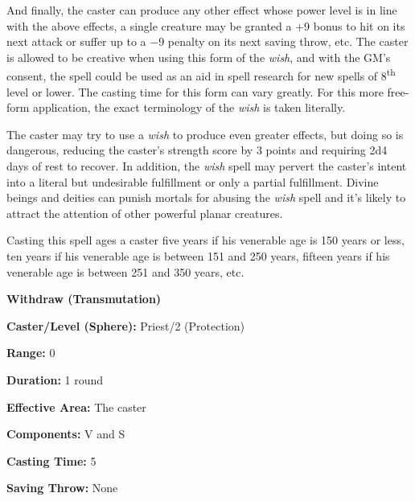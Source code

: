 \begin{multicols}{2}
And finally, the caster can produce any other effect whose power level is in line with the above effects, a single creature may be granted a +9 bonus to hit on its next attack or suffer up to a $-9$ penalty on its next saving throw, etc.  The caster is allowed to be creative when using this form of the \textit{wish}, and with the GM's consent, the spell could be used as an aid in spell research for new spells of 8\textsuperscript{th} level or lower.  The casting time for this form can vary greatly.  For this more free-form application, the exact terminology of the \textit{wish} is taken literally.

The caster may try to use a \textit{wish} to produce even greater effects, but doing so is dangerous, reducing the caster's strength score by 3 points and requiring 2d4 days of rest to recover.  In addition, the \textit{wish} spell may pervert the caster's intent into a literal but undesirable fulfillment or only a partial fulfillment.  Divine beings and deities can punish mortals for abusing the \textit{wish} spell and it's likely to attract the attention of other powerful planar creatures.

Casting this spell ages a caster five years if his venerable age is 150 years or less, ten years if his venerable age is between 151 and 250 years, fifteen years if his venerable age is between 251 and 350 years, etc.

\vspace{1em}

\noindent
\begin{minipage}{\columnwidth}

\noindent \textbf{Withdraw (Transmutation)}

\noindent \textbf{Caster/Level (Sphere):} Priest/2 (Protection)

\noindent \textbf{Range:} 0

\noindent \textbf{Duration:} 1 round

\noindent \textbf{Effective Area:} The caster

\noindent \textbf{Components:} V and S

\noindent \textbf{Casting Time:} 5

\noindent \textbf{Saving Throw:} None

\end{minipage}


\end{multicols}
